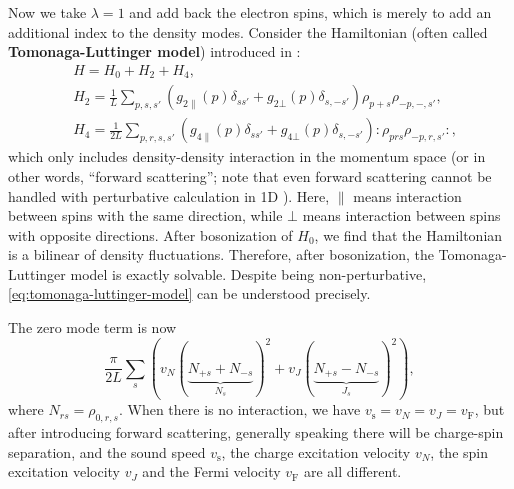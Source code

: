 \documentclass[hyperref, a4paper]{article}
\newcommand*{\normalorder}[1]{: #1 :}
\newcommand*{\concept}[1]{{\textbf{#1}}}
\begin{document}
Now we take $\lambda = 1$ and add back the electron spins, which is merely to add an additional index to the density modes.
Consider the Hamiltonian (often called \concept{Tomonaga-Luttinger model}) introduced in \cite{onedfermi1995}:
\begin{equation}
    \begin{aligned}
        & H = H_0 + H_2 + H_4,  \\
        & H_2 = \frac{1}{L} \sum_{p, s, s'} \left( g_{2 \parallel} (p) \delta_{s s'} + g_{2 \bot }(p) \delta_{s, -s'} \right) \rho_{p + s} \rho_{-p, -, s'}, \\
        & H_4 = \frac{1}{2L} \sum_{p, r, s, s'} \left( g_{4 \parallel} (p) \delta_{s s'} + g_{4 \bot }(p) \delta_{s, -s'} \right) \normalorder{\rho_{p r s} \rho_{-p, r, s'}},
    \end{aligned}
    \label{eq:tomonaga-luttinger-model}
\end{equation} 
which only includes density-density interaction in the momentum space (or in other words, ``forward scattering''; note that even forward scattering cannot be handled with perturbative calculation in 1D \cite{onedfermi1995}).
Here, $\parallel$ means interaction between spins with the same direction, while $\bot$ means interaction between spins with opposite directions.
After bosonization of $H_0$, we find that the Hamiltonian is a bilinear of density fluctuations.
Therefore, after bosonization, the Tomonaga-Luttinger model is exactly solvable.
Despite being non-perturbative, \eqref{eq:tomonaga-luttinger-model} can be understood precisely.

The zero mode term is now 
\begin{equation}
    \frac{\pi}{2L} \sum_s (v_N (\underbrace{N_{+ s} + N_{-s}}_{N_s})^2  + v_{J} (\underbrace{N_{+s} - N_{-s}}_{J_s})^2 ),
\end{equation}
where $N_{rs} = \rho_{0, r, s}$. When there is no interaction, we have $v_\text{s} = v_N = v_J = v_\text{F}$, but after 
introducing forward scattering, generally speaking there will be charge-spin separation, and the sound speed 
$v_\text{s}$, the charge excitation velocity $v_N$, the spin excitation velocity $v_J$ and the Fermi velocity 
$v_\text{F}$ are all different.
\end{document}
